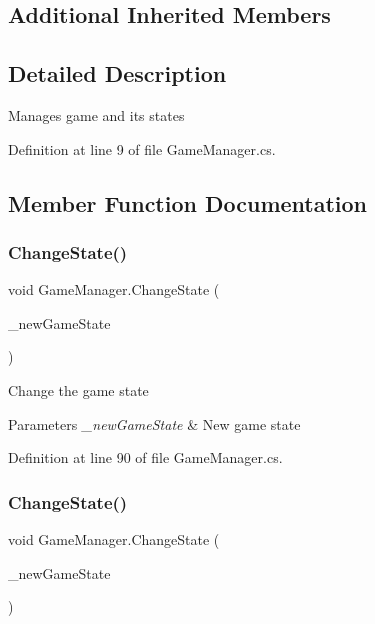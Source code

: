 \subsection*{Additional Inherited Members}


\subsection{Detailed Description}
Manages game and its states 



Definition at line 9 of file Game\+Manager.\+cs.



\subsection{Member Function Documentation}
\mbox{\label{class_game_manager_a38cc549d56890d3d3097e0a81fd7428f}} 
\subsubsection{\texorpdfstring{Change\+State()}{ChangeState()}\hspace{0.1cm}{\footnotesize\ttfamily [1/2]}}
{\footnotesize\ttfamily void Game\+Manager.\+Change\+State (\begin{DoxyParamCaption}\item[{Game\+State}]{\+\_\+new\+Game\+State }\end{DoxyParamCaption})}



Change the game state 


\begin{DoxyParams}{Parameters}
{\em \+\_\+new\+Game\+State} & New game state\\
\hline
\end{DoxyParams}


Definition at line 90 of file Game\+Manager.\+cs.

\mbox{\label{class_game_manager_a1ba9d9459bb03a4046de5fc82734c612}} 
\subsubsection{\texorpdfstring{Change\+State()}{ChangeState()}\hspace{0.1cm}{\footnotesize\ttfamily [2/2]}}
{\footnotesize\ttfamily void Game\+Manager.\+Change\+State (\begin{DoxyParamCaption}\item[{int}]{\+\_\+new\+Game\+State }\end{DoxyParamCaption})}



